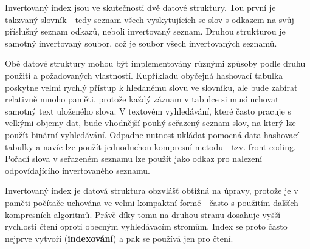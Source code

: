 \documentclass[11pt,letterpaper,oneside,openright]{book}
\begin{document}
Invertovaný index jsou ve skutečnosti dvě datové struktury. Tou první je
takzvaný slovník - tedy seznam všech vyskytujících se slov s odkazem na svůj
příslušný seznam odkazů, neboli invertovaný seznam. Druhou strukturou je
samotný invertovaný soubor, což je soubor všech invertovaných seznamů.

Obě datové struktury mohou být implementovány různými způsoby podle druhu
použití a požadovaných vlastností. Kupříkladu obyčejná hashovací tabulka
poskytne velmi rychlý přístup k hledanému slovu ve slovníku, ale bude zabírat
relativně mnoho paměti, protože každý záznam v tabulce si musí uchovat samotný
text uloženého slova. V textovém vyhledávání, které často pracuje s velkými
objemy dat, bude vhodnější pouhý seřazený seznam slov, na který lze použít
binární vyhledávání. Odpadne nutnost ukládat pomocná data hashovací tabulky a
navíc lze použít jednoduchou kompresní metodu - tzv. front coding. Pořadí slova
v seřazeném seznamu lze použít jako odkaz pro nalezení odpovídajícího
invertovaného seznamu.

Invertovaný index je datová struktura obzvlášť obtížná na úpravy, protože je v
paměti počítače uchována ve velmi kompaktní formě - často s použitím dalších
kompresních algoritmů. Právě díky tomu na druhou stranu dosahuje vyšší
rychlosti čtení oproti obecným vyhledávacím stromům. Index se proto často
nejprve vytvoří (\textbf{indexování}) a pak se používá jen pro čtení.

%
\end{document}
